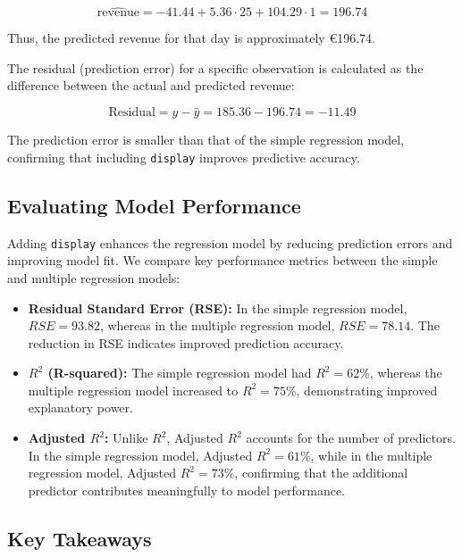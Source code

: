 \documentclass[
]{book}
\newcommand{\passthrough}[1]{#1}
\theoremstyle{definition}
\theoremstyle{definition}
\theoremstyle{definition}
\theoremstyle{definition}
\theoremstyle{remark}
\begin{document}
\[
\hat{\text{revenue}} = -41.44 + 5.36 \cdot 25 + 104.29 \cdot 1 = 196.74
\]

Thus, the predicted revenue for that day is approximately €196.74.

The residual (prediction error) for a specific observation is calculated as the difference between the actual and predicted revenue:

\[
\text{Residual} = y - \hat{y} = 185.36 - 196.74 = -11.49
\]

The prediction error is smaller than that of the simple regression model, confirming that including \passthrough{\lstinline!display!} improves predictive accuracy.

\subsection*{Evaluating Model Performance}\label{evaluating-model-performance}

Adding \passthrough{\lstinline!display!} enhances the regression model by reducing prediction errors and improving model fit. We compare key performance metrics between the simple and multiple regression models:

\begin{itemize}
\item
  \textbf{Residual Standard Error (RSE):} In the simple regression model, \(RSE = 93.82\), whereas in the multiple regression model, \(RSE = 78.14\). The reduction in RSE indicates improved prediction accuracy.
\item
  \textbf{\(R^2\) (R-squared):} The simple regression model had \(R^2 = 62\%\), whereas the multiple regression model increased to \(R^2 = 75\%\), demonstrating improved explanatory power.
\item
  \textbf{Adjusted \(R^2\):} Unlike \(R^2\), Adjusted \(R^2\) accounts for the number of predictors. In the simple regression model, Adjusted \(R^2 = 61\%\), while in the multiple regression model, Adjusted \(R^2 = 73\%\), confirming that the additional predictor contributes meaningfully to model performance.
\end{itemize}

\subsection*{Key Takeaways}\label{key-takeaways-2}
\end{document}
